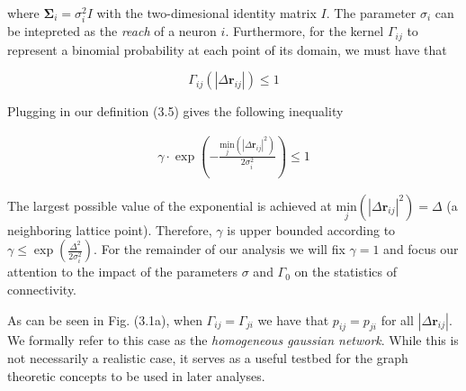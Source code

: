 \documentclass{ucetd}
\begin{document}
where $\mathbf{\Sigma}_{i} = \sigma_{i}^{2}I$ with the two-dimesional identity matrix $I$. The parameter $\sigma_{i}$ can be intepreted as the \emph{reach} of a neuron $i$. Furthermore, for the kernel $\Gamma_{ij}$ to represent a binomial probability at each point of its domain, we must have that


\begin{equation}
\Gamma_{ij}(|\Delta\mathbf{r}_{ij}|)  \leq 1
\end{equation}

Plugging in our definition (3.5) gives the following inequality

\begin{align*}
\gamma\cdot \exp\left(-\frac{\underset{j}{\mathrm{min}}\left(|\Delta\mathbf{r}_{ij}|^{2}\right)}{2\sigma_{i}^{2}} \right) \leq 1
\end{align*}

The largest possible value of the exponential is achieved at $\underset{j}{\mathrm{min}}\left(|\Delta\mathbf{r}_{ij}|^{2}\right) = \Delta$ (a neighboring lattice point). Therefore, $\gamma$ is upper bounded according to $\gamma \leq \exp\left(\frac{\Delta^{2}}{2\sigma_{i}^{2}}\right)$. For the remainder of our analysis we will fix $\gamma = 1$ and focus our attention to the impact of the parameters $\sigma$ and $\Gamma_{0}$ on the statistics of connectivity. 

As can be seen in Fig. (3.1a), when $\Gamma_{ij} = \Gamma_{ji}$ we have that $p_{ij} = p_{ji}$ for all $|\Delta \mathbf{r}_{ij}|$. We formally refer to this case as the \emph{homogeneous gaussian network}. While this is not necessarily a realistic case, it serves as a useful testbed for the graph theoretic concepts to be used in later analyses. 
\end{document}
